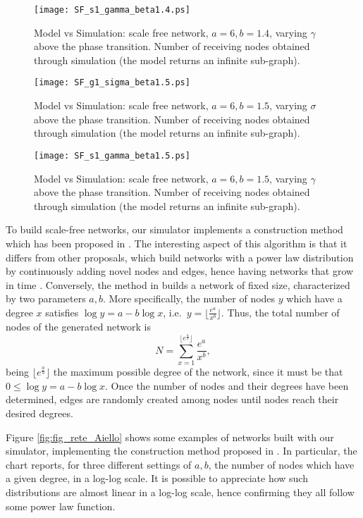 \documentclass[10pt, conference, compsocconf]{IEEEtran}
\begin{document}
\begin{figure}[t]
   \centering
   \texttt{[image: SF\_s1\_gamma\_beta1.4.ps]}
   \caption{Model vs Simulation: scale free network, $a = 6, b = 1.4$, varying $\gamma$ above the phase transition. Number of receiving nodes obtained through simulation (the model returns an infinite sub-graph).}
   \label{fig:SF_confronto_s_beta1.4}
\end{figure}

\begin{figure}[t]
   \centering
   \texttt{[image: SF\_g1\_sigma\_beta1.5.ps]}
   \caption{Model vs Simulation: scale free network, $a = 6, b = 1.5$, varying $\sigma$ above the phase transition. Number of receiving nodes obtained through simulation (the model returns an infinite sub-graph).}
   \label{fig:SF_confronto_g_beta1.5}
\end{figure}

\begin{figure}[t]
   \centering
   \texttt{[image: SF\_s1\_gamma\_beta1.5.ps]}
   \caption{Model vs Simulation: scale free network, $a = 6, b = 1.5$, varying $\gamma$ above the phase transition. Number of receiving nodes obtained through simulation (the model returns an infinite sub-graph).}
   \label{fig:SF_confronto_s_beta1.5}
\end{figure}

To build scale-free networks, our simulator implements a construction method which has been proposed in \cite{Aiello00arandom}.
The interesting aspect of this algorithm is that it differs from other proposals, which build networks with a power law distribution by continuously adding novel nodes and edges, hence having networks that grow in time \cite{Barabasi2000}. Conversely, the method in \cite{Aiello00arandom} builds a network of fixed size, characterized by two parameters $a, b$. More specifically, 
the number of nodes $y$ which have a degree $x$ satisfies $\log{y} = a - b \log{x}$, i.e.~$y = \lfloor\frac{e^a}{x^b}\rfloor$. Thus, the total number of nodes of the generated network is
$$N = \sum_{x=1}^{\lfloor e^{\frac{a}{b}}\rfloor} \frac{e^a}{x^b},$$
being $\lfloor e^{\frac{a}{b}}\rfloor$ the maximum possible degree of the network, since it must be that $0 \leq \log{y} = a - b \log{x}$.
Once the number of nodes and their degrees have been determined, edges are randomly created among nodes until nodes reach their desired degrees.

Figure \ref{fig:fig_rete_Aiello} shows some examples of networks built with our simulator, implementing the construction method proposed in \cite{Aiello00arandom}. In particular, the chart reports, for three different settings of $a, b$, the number of nodes which have a given degree, in a log-log scale. It is possible to appreciate how such distributions are almost linear in a log-log scale, hence confirming they all follow some power law function.
\end{document}
